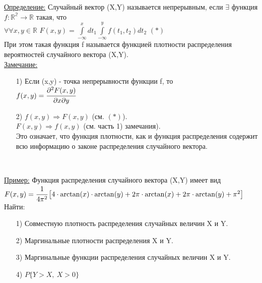 

\underline{Определение:} Случайный вектор (X,Y) называется непрерывным, если $\exists$ функция\\
$f: \mathbb{R^2} \to \mathbb{R}$ такая, что\\
$\forall \forall x,y \in \mathbb{R}$ $\displaystyle  F(x,y) = \int\limits_{-\infty}^x dt_1 \int\limits_{-\infty}^y f(t_1, t_2) dt_2$ $(*)$\\

При этом такая функция f называется функцией плотности распределения вероятностей случайного вектора (X,Y).\\


\underline{Замечание:} 
\begin{enumerate}
	\item[1)] Если (x,y) - точка непрерывности функции f, то\\
	$f(x,y) = \cfrac{\partial^2 F(x,y)}{\partial x \partial y}$
	
	\item[2)] $f(x,y) \Rightarrow F(x,y)$ (см. $(*)$).\\
	$F(x,y) \Rightarrow f(x,y)$ (см. часть 1) замечания).\\
	
	Это означает, что функция плотности, как и функция распределения содержит всю информацию о законе распределения случайного вектора.
\end{enumerate}\


\underline{Пример:} Функция распределения случайного вектора (X,Y) имеет вид\\
$F(x,y) = \cfrac{1}{4 \pi^2} \left[ 4 \cdot \arctan(x) \cdot \arctan(y) + 2\pi \cdot \arctan(x) + 2\pi \cdot \arctan(y) + \pi^2 \right]$\\
Найти:
\begin{enumerate}
	\item[1)] Совместную плотность распределения случайных величин X и Y.
	
	\item[2)] Маргинальные плотности распределения X и Y.
	
	\item[3)] Маргинальные функции распределения случайных величин X и Y.
	
	\item[4)] $P\{Y > X, \ X > 0\}$
\end{enumerate}

